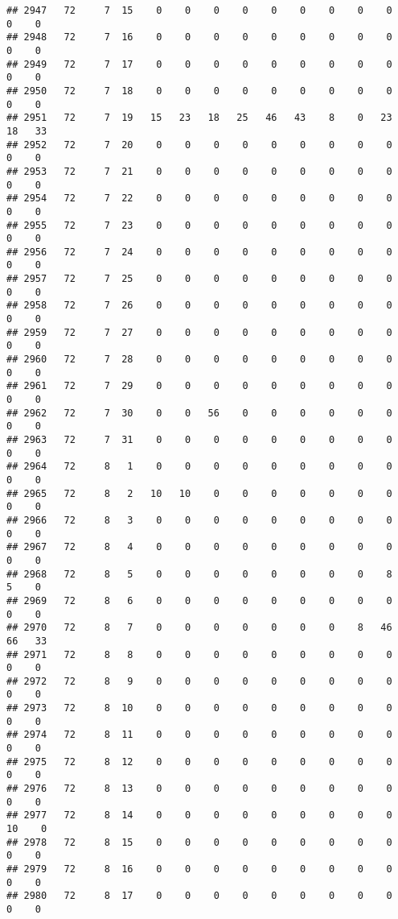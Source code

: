 \documentclass[]{article}
\begin{document}
\begin{verbatim}
## 2947   72     7  15    0    0    0    0    0    0    0    0    0    0    0
## 2948   72     7  16    0    0    0    0    0    0    0    0    0    0    0
## 2949   72     7  17    0    0    0    0    0    0    0    0    0    0    0
## 2950   72     7  18    0    0    0    0    0    0    0    0    0    0    0
## 2951   72     7  19   15   23   18   25   46   43    8    0   23   18   33
## 2952   72     7  20    0    0    0    0    0    0    0    0    0    0    0
## 2953   72     7  21    0    0    0    0    0    0    0    0    0    0    0
## 2954   72     7  22    0    0    0    0    0    0    0    0    0    0    0
## 2955   72     7  23    0    0    0    0    0    0    0    0    0    0    0
## 2956   72     7  24    0    0    0    0    0    0    0    0    0    0    0
## 2957   72     7  25    0    0    0    0    0    0    0    0    0    0    0
## 2958   72     7  26    0    0    0    0    0    0    0    0    0    0    0
## 2959   72     7  27    0    0    0    0    0    0    0    0    0    0    0
## 2960   72     7  28    0    0    0    0    0    0    0    0    0    0    0
## 2961   72     7  29    0    0    0    0    0    0    0    0    0    0    0
## 2962   72     7  30    0    0   56    0    0    0    0    0    0    0    0
## 2963   72     7  31    0    0    0    0    0    0    0    0    0    0    0
## 2964   72     8   1    0    0    0    0    0    0    0    0    0    0    0
## 2965   72     8   2   10   10    0    0    0    0    0    0    0    0    0
## 2966   72     8   3    0    0    0    0    0    0    0    0    0    0    0
## 2967   72     8   4    0    0    0    0    0    0    0    0    0    0    0
## 2968   72     8   5    0    0    0    0    0    0    0    0    8    5    0
## 2969   72     8   6    0    0    0    0    0    0    0    0    0    0    0
## 2970   72     8   7    0    0    0    0    0    0    0    8   46   66   33
## 2971   72     8   8    0    0    0    0    0    0    0    0    0    0    0
## 2972   72     8   9    0    0    0    0    0    0    0    0    0    0    0
## 2973   72     8  10    0    0    0    0    0    0    0    0    0    0    0
## 2974   72     8  11    0    0    0    0    0    0    0    0    0    0    0
## 2975   72     8  12    0    0    0    0    0    0    0    0    0    0    0
## 2976   72     8  13    0    0    0    0    0    0    0    0    0    0    0
## 2977   72     8  14    0    0    0    0    0    0    0    0    0   10    0
## 2978   72     8  15    0    0    0    0    0    0    0    0    0    0    0
## 2979   72     8  16    0    0    0    0    0    0    0    0    0    0    0
## 2980   72     8  17    0    0    0    0    0    0    0    0    0    0    0

\end{verbatim}
\end{document}
